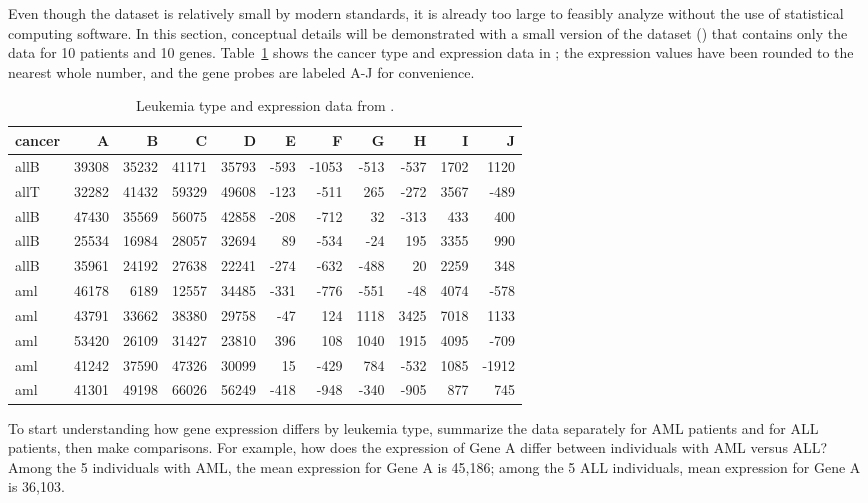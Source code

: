 Even though the  dataset is relatively small by modern standards, it is already too large to feasibly analyze without the use of statistical computing software. In this section, conceptual details will be demonstrated with a small version of the dataset () that contains only the data for 10 patients and 10 genes. Table~\ref{smallGolubData} shows the cancer type and expression data in ; the expression values have been rounded to the nearest whole number, and the gene probes are labeled A-J for convenience.

\begin{table}[ht]
	\footnotesize
	\centering
	\begin{tabular}{lrrrrrrrrrr}
		\hline
		cancer & A & B & C & D & E & F & G & H & I & J \\ 
		\hline
		allB & 39308 & 35232 & 41171 & 35793 & -593 & -1053 & -513 & -537 & 1702 & 1120 \\ 
		allT & 32282 & 41432 & 59329 & 49608 & -123 & -511 & 265 & -272 & 3567 & -489 \\ 
		allB & 47430 & 35569 & 56075 & 42858 & -208 & -712 & 32 & -313 & 433 & 400 \\ 
		allB & 25534 & 16984 & 28057 & 32694 & 89 & -534 & -24 & 195 & 3355 & 990 \\ 
		allB & 35961 & 24192 & 27638 & 22241 & -274 & -632 & -488 & 20 & 2259 & 348 \\ 
		aml & 46178 & 6189 & 12557 & 34485 & -331 & -776 & -551 & -48 & 4074 & -578 \\ 
		aml & 43791 & 33662 & 38380 & 29758 & -47 & 124 & 1118 & 3425 & 7018 & 1133 \\ 
		aml & 53420 & 26109 & 31427 & 23810 & 396 & 108 & 1040 & 1915 & 4095 & -709 \\ 
		aml & 41242 & 37590 & 47326 & 30099 & 15 & -429 & 784 & -532 & 1085 & -1912 \\ 
		aml & 41301 & 49198 & 66026 & 56249 & -418 & -948 & -340 & -905 & 877 & 745 \\ 
		\hline
	\end{tabular}
	\caption{Leukemia type and expression data from .}
	\label{smallGolubData}
\end{table}

To start understanding how gene expression differs by leukemia type, summarize the data separately for AML patients and for ALL patients, then make comparisons. For example, how does the expression of Gene A differ between individuals with AML versus ALL? Among the 5 individuals with AML, the mean expression for Gene A is 45,186; among the 5 ALL individuals, mean expression for Gene A is 36,103. 

